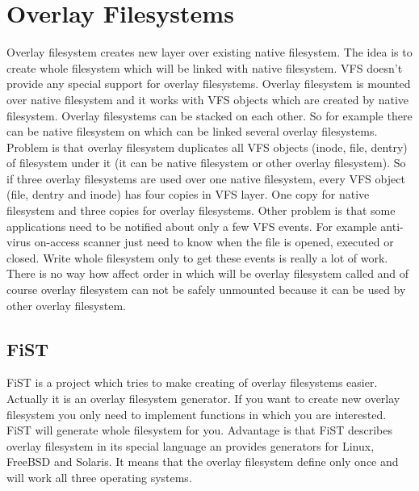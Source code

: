 \chapter{Overlay Filesystems}
\label{lab:overlay}
Overlay filesystem creates new layer over existing native filesystem. The idea is to
create whole filesystem which will be linked with native filesystem. VFS doesn't
provide any special support for overlay filesystems. Overlay filesystem is mounted
over native filesystem and it works with VFS objects which are created by native
filesystem. Overlay filesystems can be stacked on each other. So for example there can
be native filesystem on which can be linked several overlay filesystems. Problem is
that overlay filesystem duplicates all VFS objects (inode, file, dentry) of filesystem
under it (it can be native filesystem or other overlay filesystem). So if three
overlay filesystems are used over one native filesystem, every VFS object (file,
dentry and inode) has four copies in VFS layer. One copy for native filesystem and
three copies for overlay filesystems. Other problem is that some applications need to
be notified about only a few VFS events. For example anti-virus on-access scanner just
need to know when the file is opened, executed or closed. Write whole filesystem only
to get these events is really a lot of work. There is no way how affect order in
which will be overlay filesystem called and of course overlay filesystem can not be
safely unmounted because it can be used by other overlay filesystem.

\section{FiST}
FiST is a project which tries to make creating of overlay filesystems easier. Actually
it is an overlay filesystem generator. If you want to create new overlay filesystem you
only need to implement functions in which you are interested. FiST will generate whole
filesystem for you. Advantage is that FiST describes overlay filesystem in its special
language an provides generators for Linux, FreeBSD and Solaris. It means that the
overlay filesystem define only once and will work all three operating systems.
